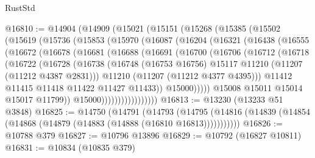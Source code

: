 \begin{lexlean}{RustStd}
\begin{coremodule}
@16810 := @14904
    (@14909
      (@15021
        (@15151
          (@15268
            (@15385
              (@15502
                (@15619
                  (@15736
                    (@15853
                      (@15970
                        (@16087
                          (@16204
                            (@16321
                              (@16438
                                (@16555
                                  (@16672
                                    (@16678
                                      (@16681
                                        (@16688
                                          (@16691
                                            (@16700
                                              (@16706
                                                (@16712
                                                  (@16718
                                                    (@16722
                                                      (@16728
                                                        (@16738
                                                          (@16748
                                                            (@16753 @16756)
                                                            @15117
                                                            @11210
                                                            (@11207 (@11212 @4387 @2831)))
                                                          @11210
                                                          (@11207 (@11212 @4377 @4395)))
                                                        @11412
                                                        @11415
                                                        @11418
                                                        @11422
                                                        @11427
                                                        @11433))
                                                    @15000)))))
                                          @15008
                                          @15011
                                          @15014
                                          @15017
                                          @11799))
                                      @15000)))))))))))))))))
@16813 := @13230 (@13233 @51 @3848)
@16825 := @14750
    (@14791
      (@14793
        (@14795 (@14816 (@14839 (@14854 (@14868 (@14879 (@14883 (@14888 (@16810 @16813)))))))))))
@16826 := @10788 @379
@16827 := @10796 @13896
@16829 := @10792 (@16827 @10811)
@16831 := @10834 (@10835 @379)

\end{coremodule}
\end{lexlean}
